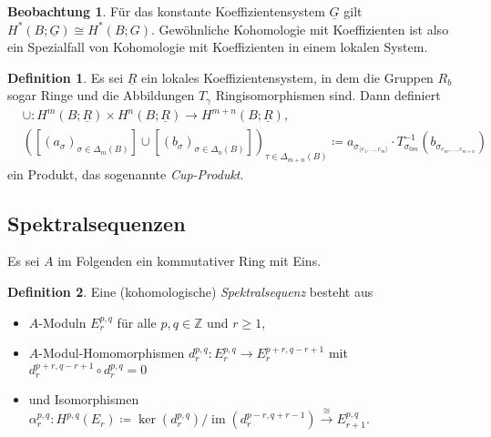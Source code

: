 \documentclass[11pt, a4paper, german]{article}
\theoremstyle{definition}
\newtheorem{defn}{Definition}
\newtheorem{beob}{Beobachtung}
\theoremstyle{remark}
\newcommand{\Z}{\mathbb{Z}} %
\DeclareMathOperator{\im}{im} %
\newcommand{\angles}[1]{{\langle #1 \rangle}}
\newcommand{\ES}{Es sei} %
\begin{document}
\begin{beob}
  Für das konstante Koeffizientensystem $\underline{G}$ gilt $H^*(B; \underline{G}) \cong H^*(B; G)$.
  Gewöhnliche Kohomologie mit Koeffizienten ist also ein Spezialfall von Kohomologie mit Koeffizienten in einem lokalen System.
\end{beob}

\begin{defn}
  Es sei $\underline{R}$ ein lokales Koeffizientensystem, in dem die Gruppen $R_b$ sogar Ringe und die Abbildungen $T_\gamma$ Ringisomorphismen sind. Dann definiert
  \begin{align*}
    & \cup : H^m(B; \underline{R}) \times H^n(B; \underline{R}) \to H^{m+n}(B; \underline{R}), \\
    & ([(a_\sigma)_{\sigma \in \Delta_m(B)}] \cup [(b_\sigma)_{\sigma \in \Delta_n(B)}])_{\tau \in \Delta_{m+n}(B)} \coloneqq a_{\sigma_{\angles{e_1, \ldots, e_m}}} \cdot T_{\sigma_{0m}}^{-1}(b_{\sigma_{e_m, \ldots, e_{m+n}}})
  \end{align*}
  ein Produkt, das sogenannte \emph{Cup-Produkt}.
\end{defn}

\subsection{Spektralsequenzen}


\ES{} $A$ im Folgenden ein kommutativer Ring mit Eins.

\begin{defn}
  Eine (kohomologische) \emph{Spektralsequenz} besteht aus
  \begin{itemize}
    \item $A$-Moduln $E_r^{p,q}$ für alle $p, q \in \Z$ und $r \geq 1$,
    \item $A$-Modul-Homomorphismen $d_r^{p,q} : E_r^{p,q} \to E_r^{p+r,q-r+1}$ mit $d_r^{p+r,q-r+1} \circ d_r^{p,q} = 0$
    \item und Isomorphismen $\alpha_r^{p,q} : H^{p,q}(E_r) \!\coloneqq\! \ker(d_r^{p,q}) / \im(d_r^{p-r,q+r-1}) \xrightarrow{\cong} E_{r+1}^{p,q}$.
  \end{itemize}
\end{defn}
\end{document}
